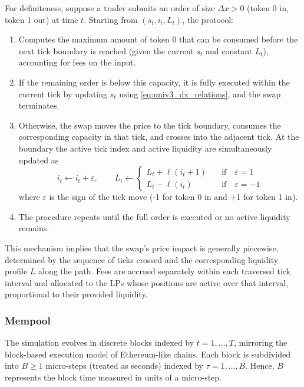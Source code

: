\documentclass[11pt]{article}
\begin{document}
For definiteness, suppose a trader submits an order of size $\Delta x>0$ (token 0 in, token 1 out) at time $t$.
Starting from $(s_t, i_t, L_t)$, the protocol:
\begin{enumerate}[leftmargin=*]
  \item Computes the maximum amount of token 0 that can be consumed before the next tick boundary is reached (given the current $s_t$ and constant $L_t$), accounting for fees on the input.
  \item If the remaining order is below this capacity, it is fully executed within the current tick by updating $s_t$ using \eqref{eq:univ3_dx_relations}, and the swap terminates.
  \item Otherwise, the swap moves the price to the tick boundary, consumes the corresponding capacity in that tick, and crosses into the adjacent tick. At the boundary the active tick index and active liquidity are simultaneously updated as
  \begin{equation}
    i_t \leftarrow i_t + \varepsilon, \qquad
    L_t \leftarrow \begin{cases}L_t +  \ell(i_t+1) \quad &\text{if} \quad  \varepsilon=1 \\
                                L_t -  \ell(i_t) \quad &\text{if} \quad  \varepsilon=-1\end{cases}
  \end{equation}
  where $\varepsilon$ is the sign of the tick move (-1 for token 0 in and +1 for token 1 in).
  \item The procedure repeats until the full order is executed or no active liquidity remains.
\end{enumerate}

This mechanism implies that the swap's price impact is generally piecewise, determined by the sequence of ticks crossed and the corresponding liquidity profile $L$ along the path. Fees are accrued separately within each traversed tick interval and allocated to the LPs whose positions are active over that interval, proportional to their provided liquidity.

\subsubsection{Mempool}
\label{subsubsec:mempool}

The simulation evolves in discrete blocks indexed by $t=1,\dots,T$, mirroring the
block-based execution model of Ethereum-like chains. Each block is subdivided into
$B\ge 1$ micro-steps (treated as seconds) indexed by $\tau=1,\dots,B$. Hence, $B$ represents the block time measured in units of a micro-step. 
\end{document}
